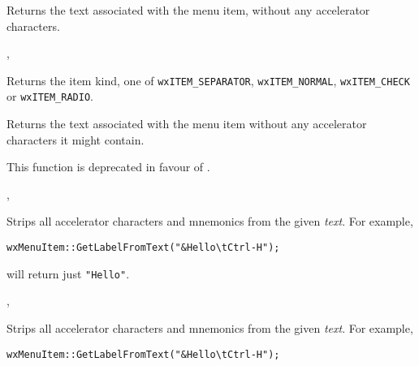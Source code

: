 Returns the text associated with the menu item, without any accelerator
characters.


, 


\label{wxmenuitemgetkind}


Returns the item kind, one of {\tt wxITEM\_SEPARATOR}, {\tt wxITEM\_NORMAL}, 
{\tt wxITEM\_CHECK} or {\tt wxITEM\_RADIO}.


\label{wxmenuitemgetlabel}


Returns the text associated with the menu item without any accelerator
characters it might contain.

This function is deprecated in favour of .


, 


\label{wxmenuitemgetlabeltext}


Strips all accelerator characters and mnemonics from the given {\it text}.
For example,

\begin{verbatim}
wxMenuItem::GetLabelFromText("&Hello\tCtrl-H");
\end{verbatim}

will return just {\tt "Hello"}.


, 


\label{wxmenuitemgetlabelfromtext}


Strips all accelerator characters and mnemonics from the given {\it text}.
For example,

\begin{verbatim}
wxMenuItem::GetLabelFromText("&Hello\tCtrl-H");
\end{verbatim}

